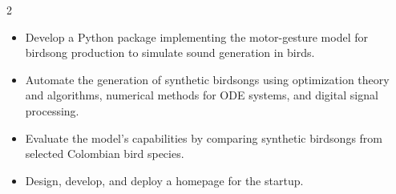 \documentclass[10pt,legalpaper,ragged2e,withhyper]{altacv}
\begin{document}
\begin{paracol}{2}
\begin{itemize}
	
	
\end{itemize}

\divider

\begin{itemize}
	\item Develop a Python package implementing the motor-gesture model for birdsong production to simulate sound generation in birds.

	\item Automate the generation of synthetic birdsongs using optimization theory and algorithms, numerical methods for ODE systems, and digital signal processing.

	\item Evaluate the model's capabilities by comparing synthetic birdsongs from selected Colombian bird species.


\end{itemize}

\divider


\begin{itemize}
\item Design, develop, and deploy a homepage for the startup.


\end{itemize}
\end{paracol}
\end{document}
